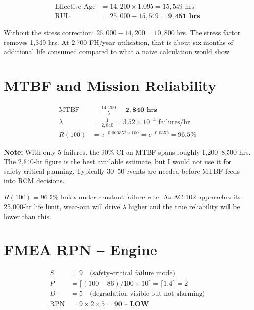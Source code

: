 \documentclass[11pt, a4paper]{report}
\begin{document}
\begin{align}
  \text{Effective Age} &= 14{,}200 \times 1.095 = 15{,}549 \text{ hrs} \\[4pt]
  \text{RUL}           &= 25{,}000 - 15{,}549 = \mathbf{9{,}451 \text{ hrs}}
\end{align}

Without the stress correction: $25{,}000 - 14{,}200 = 10{,}800$ hrs.
The stress factor removes 1,349 hrs. At 2,700 FH/year utilisation, that is
about six months of additional life consumed compared to what a naive calculation
would show.

\section{MTBF and Mission Reliability}

\begin{align}
  \text{MTBF} &= \frac{14{,}200}{5} = \mathbf{2{,}840 \text{ hrs}} \\[4pt]
  \lambda     &= \frac{1}{2{,}840} = 3.52 \times 10^{-4} \text{ failures/hr} \\[4pt]
  R(100)      &= e^{-0.000352 \times 100} = e^{-0.0352} = \mathbf{96.5\%}
\end{align}

\medskip
\noindent\textbf{Note:} With only 5 failures, the 90\% CI on MTBF spans roughly
1,200--8,500 hrs. The 2,840-hr figure is the best available estimate, but I
would not use it for safety-critical planning. Typically 30--50 events are
needed before MTBF feeds into RCM decisions.

$R(100) = 96.5\%$ holds under constant-failure-rate. As AC-102 approaches
its 25,000-hr life limit, wear-out will drive $\lambda$ higher and the true
reliability will be lower than this.

\section{FMEA RPN -- Engine}

\begin{align}
  S   &= 9 \quad \text{(safety-critical failure mode)} \\
  P   &= \lceil (100 - 86) / 100 \times 10 \rceil = \lceil 1.4 \rceil = 2 \\
  D   &= 5 \quad \text{(degradation visible but not alarming)} \\[4pt]
  \text{RPN} &= 9 \times 2 \times 5 = \mathbf{90 \text{ -- LOW}}
\end{align}
\end{document}
